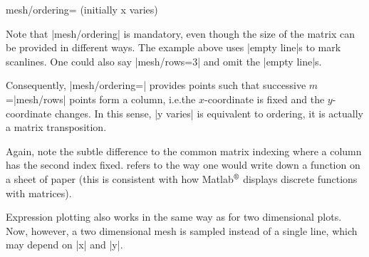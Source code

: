 {\begin{pgfplotskey}{mesh/ordering= (initially x varies)}
\begin{codeexample}[]
\end{codeexample}
    \noindent Note that |mesh/ordering| is mandatory, even though the size of
    the matrix can be provided in different ways. The example above uses
    |empty line|s to mark scanlines. One could also say |mesh/rows=3| and omit
    the |empty line|s.

    Consequently, |mesh/ordering=| provides points such
    that successive $m$=|mesh/rows| points form a column, i.e.\@ the
    $x$-coordinate is fixed and the $y$-coordinate changes. In this sense,
    |y varies| is equivalent to  ordering, it is actually
    a matrix transposition.
\begin{codeexample}[]
\end{codeexample}
    Again, note the subtle difference to the common matrix indexing where a
    column has the second index fixed. \PGFPlots{} refers to the way one would
    write down a function on a sheet of paper (this is consistent with how
    Matlab$^\text{\textregistered}$ displays discrete functions with matrices).
\end{pgfplotskey}

\begin{addplot3operation}[]{}{}
\label{cmd:addplot3:expr}
    Expression plotting also works in the same way as for two dimensional
    plots. Now, however, a two dimensional mesh is sampled instead of a single
    line, which may depend on |x| and |y|.


\end{addplot3operation}}
